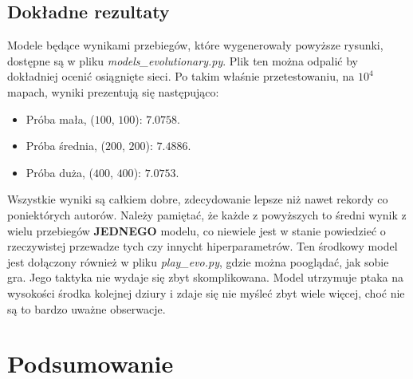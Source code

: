 \documentclass[12pt, A4]{article}
\begin{document}
\subsection{Dokładne rezultaty}
Modele będące wynikami przebiegów, które wygenerowały powyższe rysunki, dostępne są w pliku \textit{models\_evolutionary.py}. Plik ten można odpalić by dokładniej ocenić osiągnięte sieci. Po takim właśnie przetestowaniu, na $10^4$ mapach, wyniki prezentują się następująco:
\begin{itemize}
	\item Próba mała, ($100$, $100$): $7.0758$.
	\item Próba średnia, ($200$, $200$): $7.4886$.
	\item Próba duża, ($400$, $400$): $7.0753$.
\end{itemize}
Wszystkie wyniki są całkiem dobre, zdecydowanie lepsze niż nawet rekordy co poniektórych autorów. Należy pamiętać, że każde z powyższych to średni wynik z wielu przebiegów \textbf{JEDNEGO} modelu, co niewiele jest w stanie powiedzieć o rzeczywistej przewadze tych czy innycht hiperparametrów.
\newline\newline
Ten środkowy model jest dołączony również w pliku \textit{play\_evo.py}, gdzie można pooglądać, jak sobie gra.
\newline
Jego taktyka nie wydaje się zbyt skomplikowana. Model utrzymuje ptaka na wysokości środka kolejnej dziury i zdaje się nie myśleć zbyt wiele więcej, choć nie są to bardzo uważne obserwacje.


\section{Podsumowanie}
\end{document}
